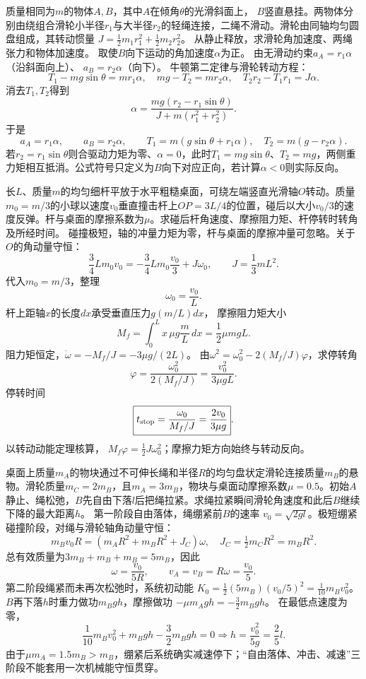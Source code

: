 
\problemtext 质量相同为$m$的物体$A,B$，其中$A$在倾角$\theta$的光滑斜面上，
$B$竖直悬挂。两物体分别由绕组合滑轮小半径$r_1$与大半径$r_2$的轻绳连接，二绳不滑动。滑轮由同轴均匀圆盘组成，其转动惯量
$J=\frac12m_1r_1^2+\frac12m_2r_2^2$。
从静止释放，求滑轮角加速度、两绳张力和物体加速度。
\workings
取使$B$向下运动的角加速度$\alpha$为正。
由无滑动约束$a_A=r_1\alpha$（沿斜面向上）、
$a_B=r_2\alpha$（向下）。
牛顿第二定律与滑轮转动方程：
\[
T_1-mg\sin\theta=mr_1\alpha,\quad
mg-T_2=mr_2\alpha,\quad
T_2r_2-T_1r_1=J\alpha.
\]
消去$T_1,T_2$得到
\[
\boxed{\alpha=\frac{mg(r_2-r_1\sin\theta)}
{J+m(r_1^2+r_2^2)}}.
\]
于是
\[
\boxed{a_A=r_1\alpha,\qquad a_B=r_2\alpha},\qquad
\boxed{T_1=m(g\sin\theta+r_1\alpha),\quad
T_2=m(g-r_2\alpha)}.
\]
\crosscheck 若$r_2=r_1\sin\theta$则合驱动力矩为零、$\alpha=0$，此时$T_1=mg\sin\theta$、$T_2=mg$，两侧重力矩相互抵消。公式符号只定义为$B$向下对应正向，若计算$\alpha<0$则实际反向。

\problemtext 长$L$、质量$m$的均匀细杆平放于水平粗糙桌面，可绕左端竖直光滑轴$O$转动。质量$m_0=m/3$的小球以速度$v_0$垂直撞击杆上$OP=3L/4$的位置，碰后以大小$v_0/3$的速度反弹。杆与桌面的摩擦系数为$\mu$。求碰后杆角速度、摩擦阻力矩、杆停转时转角及所经时间。
\workings
碰撞极短，轴的冲量力矩为零，杆与桌面的摩擦冲量可忽略。关于$O$的角动量守恒：
\[
\frac34Lm_0v_0=-\frac34Lm_0\frac{v_0}{3}+J\omega_0,
\qquad J=\frac13mL^2.
\]
代入$m_0=m/3$，整理
\[
\boxed{\omega_0=\frac{v_0}{L}}.
\]
杆上距轴$x$的长度$dx$承受垂直压力$g(m/L)dx$，
摩擦阻力矩大小
\[
\boxed{M_f=\int_0^L x\,\mu g\frac mL\,dx
=\frac12\mu mgL}.
\]
阻力矩恒定，$\dot\omega=-M_f/J=-3\mu g/(2L)$。
由$\omega^2=\omega_0^2-2(M_f/J)\varphi$，求停转角
\[
\boxed{\varphi=\frac{\omega_0^2}{2(M_f/J)}
=\frac{v_0^2}{3\mu gL}}.
\]
停转时间
\[
\boxed{t_{\rm stop}=\frac{\omega_0}{M_f/J}
=\frac{2v_0}{3\mu g}}.
\]
\crosscheck 以转动动能定理核算，
$M_f\varphi=\tfrac12J\omega_0^2$；摩擦力矩方向始终与转动反向。

\problemtext 桌面上质量$m_A$的物块通过不可伸长绳和半径$R$的均匀盘状定滑轮连接质量$m_B$的悬物。滑轮质量$m_C=2m_B$，且$m_A=3m_B$，物块与桌面动摩擦系数$\mu=0.5$。初始$A$静止、绳松弛，$B$先自由下落$l$后把绳拉紧。求绳拉紧瞬间滑轮角速度和此后$B$继续下降的最大距离$h$。
\workings
第一阶段自由落体，绳绷紧前$B$的速率
$v_0=\sqrt{2gl}$。极短绷紧碰撞阶段，对绳与滑轮轴角动量守恒：
\[
m_Bv_0R=(m_AR^2+m_BR^2+J_C)\omega,\quad
J_C=\tfrac12m_CR^2=m_BR^2.
\]
总有效质量为$3m_B+m_B+m_B=5m_B$，因此
\[
\boxed{\omega=\frac{v_0}{5R}},
\qquad
v_A=v_B=R\omega=\frac{v_0}{5}.
\]
第二阶段绳紧而未再次松弛时，系统初动能
$K_0=\frac12(5m_B)(v_0/5)^2=\frac1{10}m_Bv_0^2$。
$B$再下落$h$时重力做功$m_Bgh$，摩擦做功
$-\mu m_Agh=-\frac32m_Bgh$。
在最低点速度为零，
\[
\frac1{10}m_Bv_0^2+m_Bgh-\frac32m_Bgh=0
\Longrightarrow
\boxed{h=\frac{v_0^2}{5g}=\frac25l}.
\]
\crosscheck 由于$\mu m_A=1.5m_B>m_B$，绷紧后系统确实减速停下；“自由落体、冲击、减速”三阶段不能套用一次机械能守恒贯穿。

